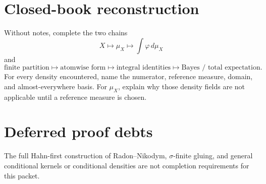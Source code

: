 \section*{Closed-book reconstruction}

Without notes, complete the two chains
\[
\boxed{X}
\longmapsto
\boxed{\mu_X}
\longmapsto
\boxed{\int\varphi\,d\mu_X}
\]
and
\[
\boxed{\text{finite partition}}
\longmapsto
\boxed{\text{atomwise form}}
\longmapsto
\boxed{\text{integral identities}}
\longmapsto
\boxed{\text{Bayes / total expectation}}.
\]
For every density encountered, name the numerator, reference measure, domain, and almost-everywhere basis. For $\mu_X$, explain why those density fields are not applicable until a reference measure is chosen.

\section*{Deferred proof debts}

The full Hahn-first construction of Radon--Nikodym, $\sigma$-finite gluing, and general conditional kernels or conditional densities are not completion requirements for this packet.
